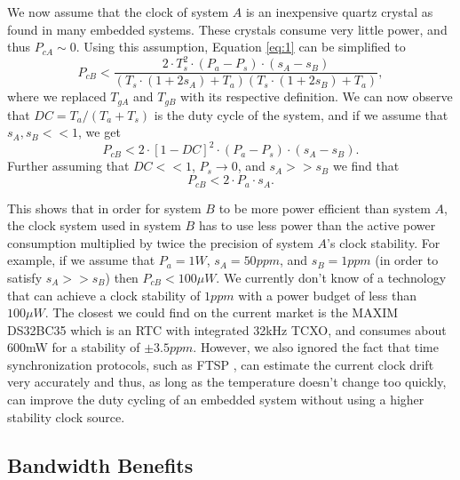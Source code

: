 We now assume that the clock of system $A$ is an inexpensive quartz crystal as
found in many embedded systems. These crystals consume very little power, and thus
$P_{cA} \sim 0$. Using this assumption, Equation \ref{eq:1} can be simplified to
\begin{equation}
P_{cB} < \frac{2\cdot T_s^2\cdot(P_a-P_s)\cdot(s_A-s_B)}{(T_s\cdot(1+2s_A)+T_a)(T_s\cdot(1+2s_B)+T_a)},
	\label{eq:2}
\end{equation}
where we replaced $T_{gA}$ and $T_{gB}$ with its respective definition. We can
now observe that $DC=T_a/(T_a + T_s)$ is the duty cycle of the system, and if
we assume that $s_A, s_B << 1$, we get
\begin{equation}
	P_{cB} < 2 \cdot [1-DC]^2\cdot (P_a-P_s) \cdot (s_A-s_B).
\end{equation}
Further assuming that $DC << 1$, $P_s \rightarrow 0$, and $s_A >> s_B$ we find that
\begin{equation}
	P_{cB} < 2 \cdot P_a \cdot s_A.
\end{equation}

This shows that in order for system $B$ to be more power efficient than system
$A$, the clock system used in system $B$ has to use less power than the active
power consumption multiplied by twice the precision of system $A$'s clock
stability. For example, if we assume that $P_a=1W$, $s_A=50 ppm$, and $s_B=1
ppm$ (in order to satisfy $s_A >> s_B$) then $P_{cB} < 100 \mu W$. We
currently don't know of a technology that can achieve a clock stability of
$1ppm$ with a power budget of less than $100 \mu W$. The closest we could find
on the current market is the MAXIM DS32BC35 \cite{maxim2008ds32b35} which is
an RTC with integrated 32kHz TCXO, and consumes about 600mW for a stability of
$\pm 3.5ppm$. However, we also ignored the fact that time synchronization
protocols, such as FTSP \cite{maroti2004ftsp}, can estimate the current clock
drift very accurately and thus, as long as the temperature doesn't change too
quickly, can improve the duty cycling of an embedded system without using a
higher stability clock source.


\subsection{Bandwidth Benefits}

